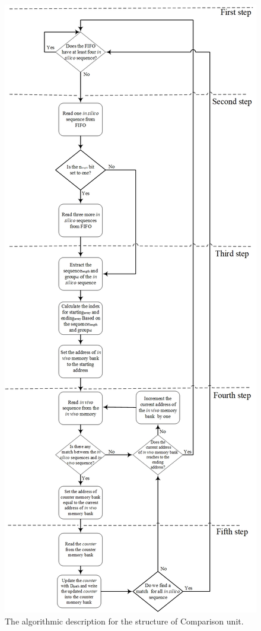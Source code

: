 \begin{figure}
\begin{center}
\includegraphics[clip,width=0.6\linewidth]{Fig/Comparison_Unit.jpg}
\caption{The algorithmic description for the structure of Comparison unit.}
\label{fig:ComparisonUnit}
\end{center}
\end{figure}
